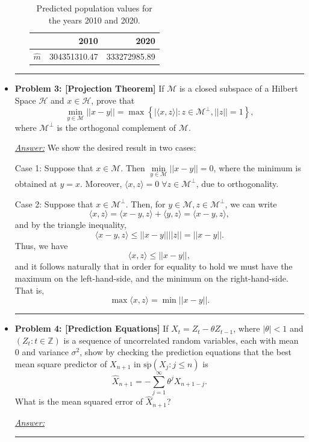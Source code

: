 \documentclass[a4paper, 11pt]{article}
\begin{document}
\begin{itemize}
\begin{enumerate}[(a)]
		\begin{table}[h!]
		\centering
		\begin{tabular}{rrr}
			\hline
			& 2010 & 2020 \\ 
			\hline
		$\widehat{m}$ & 304351310.47 & 333272985.89 \\ 
			\hline
		\end{tabular}
		\caption{Predicted population values for the years 2010 and 2020.}
		\end{table}


\end{enumerate}
	

	\hrule 
	\newpage \newpage 
	\item \textbf{Problem 3: [Projection Theorem]} If $\mathcal{M}$ is a closed subspace of a Hilbert Space $\mathcal{H}$ and $x\in\mathcal{H}$, prove that 
	$$\underset{y\in\mathcal{M}}{\min}||x-y|| = \max\left\{|\langle x,z\rangle|: z\in \mathcal{M}^\bot, ||z|| = 1  \right\} ,$$
where $\mathcal{M}^\bot$ is the orthogonal complement of $\mathcal{M}$. \newline 

	\underline{\emph{Answer:}} We show the desired result in two cases:\newline
	
	Case 1: Suppose that $x\in\mathcal{M}$. Then $\underset{y\in\mathcal{M}}{\min}||x-y|| = 0$, where the minimum is obtained at $y = x$. Moreover, $\langle x,z\rangle = 0\; \forall z\in \mathcal{M}^\bot$, due to orthogonality. \newline 
	
	Case 2: Suppose that $x\in\mathcal{M}^\bot$. Then, for $y\in\mathcal{M}, z\in\mathcal{M}^\bot$,  we can write 
	$$\langle x,z \rangle = \langle x-y,z \rangle + \langle y,z\rangle  = \langle x-y,z \rangle,$$
	and by the triangle inequality,
	$$\langle x-y,z \rangle \leq ||x-y|| ||z|| = ||x-y||.$$
	Thus, we have 
	$$\langle x,z \rangle \leq ||x-y||,$$
	and it follows naturally that in order for equality to hold we must have the maximum on the left-hand-side, and the minimum on the right-hand-side. That is, 
	$$\max \langle x,z \rangle  = \min ||x-y||.$$
	
	\hrule 
	\item \textbf{Problem 4: [Prediction Equations]} If $X_t = Z_t - \theta Z_{t-1}$, where $|\theta| <1$ and $(Z_t: t\in\mathbb{Z})$ is a sequence of uncorrelated random variables, each with mean 0 and variance $\sigma^2$, show by checking the prediction equations that the best mean square predictor of $X_{n+1}$ in $\overline{\text{sp}}(X_j: j \leq n)$ is 
	$$\hat{X}_{n+1} = -\sum_{j=1}^\infty \theta^j X_{n+1-j}. $$
	What is the mean squared error of $\hat{X}_{n+1}$?

	\underline{\emph{Answer:}} \newline 
	
	\hrule 


\end{itemize}	
\end{document}
